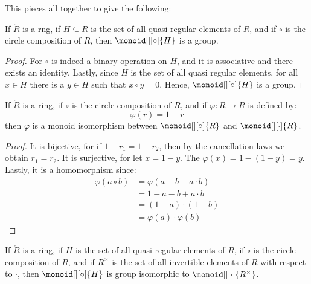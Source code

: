             This pieces all together to give the following:
            \begin{theorem}
                If $\ring{R}$ is a rng, if $H\subseteq{R}$ is the set of all
                quasi regular elements of $R$, and if $\circ$ is the
                circle composition of $R$, then $\monoid[][\circ]{H}$ is a
                group.
            \end{theorem}
            \begin{proof}
                For $\circ$ is indeed a binary operation on $H$, and it is
                associative and there exists an identity. Lastly, since $H$
                is the set of all quasi regular elements, for all $x\in{H}$
                there is a $y\in{H}$ such that $x\circ{y}=0$. Hence,
                $\monoid[][\circ]{H}$ is a group.
            \end{proof}
            \begin{theorem}
                If $\ring{R}$ is a ring, if $\circ$ is the circle
                composition of $R$, and if $\varphi:R\rightarrow{R}$ is
                defined by:
                \begin{equation}
                    \varphi(r)=1-r
                \end{equation}
                then $\varphi$ is a monoid isomorphism between
                $\monoid[][\circ]{R}$ and $\monoid[][\cdot]{R}$.
            \end{theorem}
            \begin{proof}
                It is bijective, for if $1-r_{1}=1-r_{2}$, then by the
                cancellation laws we obtain $r_{1}=r_{2}$. It is surjective,
                for let $x=1-y$. The $\varphi(x)=1-(1-y)=y$. Lastly, it is
                a homomorphism since:
                \begin{subequations}
                    \begin{align}
                        \varphi(a\circ{b})
                            &=\varphi(a+b-a\cdot{b})\\
                            &=1-a-b+a\cdot{b}\\
                            &=(1-a)\cdot(1-b)\\
                            &=\varphi(a)\cdot\varphi(b)
                    \end{align}
                \end{subequations}
            \end{proof}
            \begin{theorem}
                If $\ring{R}$ is a ring, if $H$ is the set of all quasi
                regular elements of $R$, if $\circ$ is the circle
                composition of $R$, and if $R^{\times}$ is the set of all
                invertible elements of $R$ with respect to $\cdot$, then
                $\monoid[][\circ]{H}$ is group isomorphic to
                $\monoid[][\cdot]{R^{\times}}$.
            \end{theorem}

